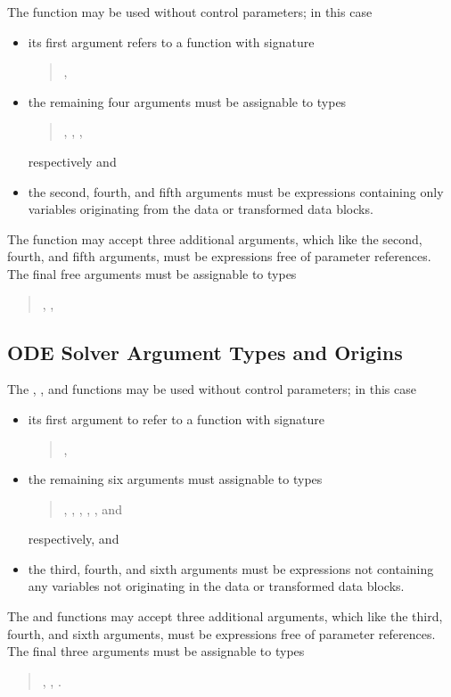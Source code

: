 The  function may be used without control
parameters; in this case
%
\begin{itemize}
\item its first argument refers to a function with signature
\begin{quote}
  ,
\end{quote}
\item the remaining four arguments must be assignable to types
\begin{quote}
  , , , 
\end{quote}
  respectively and
  \item the second, fourth, and fifth arguments must be expressions
  containing only variables originating from the data or transformed
  data blocks.
\end{itemize}
%
The  function may accept three additional arguments,
which like the second, fourth, and fifth arguments, must be expressions free
of parameter references. The final free arguments must be assignable to types
\begin{quote}
, , 
\end{quote}


\subsection{ODE Solver Argument Types and Origins}

The , , and
 functions may be used without control
parameters;  in this case
%
\begin{itemize}
\item its first argument to refer to a function with signature
\begin{quote}
 ,
\end{quote}
\item the remaining six arguments must assignable to types
\begin{quote}
  , , , ,
, and 
\end{quote}
 respectively, and
\item the third, fourth, and sixth arguments must be expressions not
  containing any variables not originating in the data or transformed
  data blocks.
\end{itemize}
%
The  and 
functions may accept three additional arguments, which like the third,
fourth, and sixth arguments, must be expressions free of parameter
references.  The final three arguments must be assignable to types
\begin{quote}
, , .
\end{quote}

